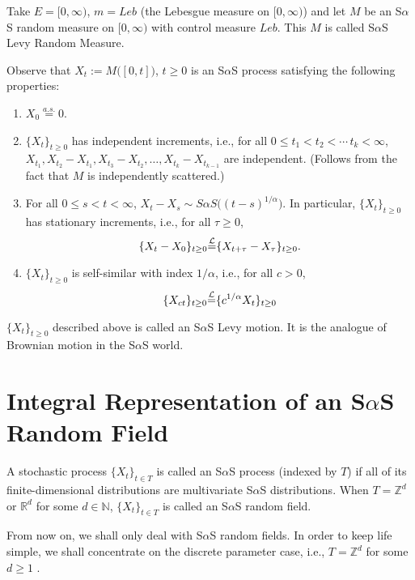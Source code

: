 \documentclass[12pt]{amsart}
\begin{document}
\begin{example}  \textnormal{Take $E = [0,\infty)$, $m=Leb$ (the Lebesgue measure on $[0,\infty)$) and let $M$ be an S$\alpha$S random measure on $[0,\infty)$ with control measure $Leb$. This $M$ is called S$\alpha$S Levy Random Measure.}

\textnormal{Observe that $X_t:=M\big([0,t]\big)$, $t \geq 0$ is an S$\alpha$S process satisfying the following properties:}
\begin{enumerate}
\item \textnormal{$X_0 {\stackrel{a.s.}{=}} 0$.}
\item \textnormal{$\{X_t\}_{t \geq 0}$ has independent increments, i.e., for all $0 \leq t_1 < t_2 < \cdots \,t_k <\infty$, $X_{t_1}, X_{t_2}-X_{t_1}, X_{t_3}-X_{t_2}, \ldots, X_{t_k}-X_{t_{k-1}}$ are independent. (Follows from the fact that $M$ is independently scattered.)}
\item \textnormal{For all $0 \leq s < t < \infty$, $X_t - X_s \sim S\alpha S\big((t-s)^{1/\alpha}\big)$. In particular, $\{X_t\}_{t \geq 0}$ has stationary increments, i.e., for all $\tau \geq 0$,}
    \[
    \{X_t - X_0\}_{t \geq 0} {\stackrel{\footnotesize{\mathcal{L}}}{=}} \{X_{t+\tau}-X_\tau\}_{t \geq 0}.
    \]
\item \textnormal{$\{X_t\}_{t \geq 0}$ is self-similar with index ${1}/{\alpha}$, i.e., for all $c>0$,}
    \[
    \{X_{ct}\}_{t \geq 0} {\stackrel{\footnotesize{\mathcal{L}}}{=}} \{c^{1/\alpha} X_{t}\}_{t \geq 0}
    \]
\end{enumerate}
\textnormal{$\{X_t\}_{t \geq 0}$ described above is called an S$\alpha$S Levy motion. It is the analogue of Brownian motion in the S$\alpha$S world.}
\end{example}

\section{Integral Representation of an S$\alpha$S Random Field} \label{sec:int_repn_sas_rf}

\begin{defn} A stochastic process $\{X_t\}_{t \in T}$ is called an S$\alpha$S process (indexed by $T$) if all of its finite-dimensional distributions are multivariate S$\alpha$S distributions. When $T=\mathbb{Z}^d$ or $\mathbb{R}^d$ for some $d \in \mathbb{N}$, $\{X_t\}_{t \in T}$ is called an S$\alpha$S random field.
\end{defn}

From now on, we shall only deal with S$\alpha$S random fields. In order to keep life simple, we shall concentrate on the discrete parameter case, i.e., $T=\mathbb{Z}^d$ for some $d \geq 1$ .
\end{document}

